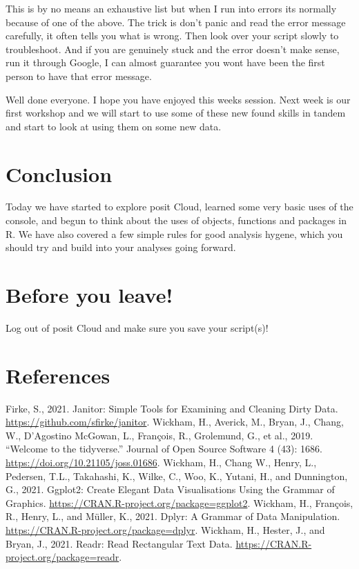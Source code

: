 \documentclass[
]{book}
\begin{document}
This is by no means an exhaustive list but when I run into errors its normally because of one of the above. The trick is don't panic and read the error message carefully, it often tells you what is wrong. Then look over your script slowly to troubleshoot. And if you are genuinely stuck and the error doesn't make sense, run it through Google, I can almost guarantee you wont have been the first person to have that error message.

Well done everyone. I hope you have enjoyed this weeks session. Next week is our first workshop and we will start to use some of these new found skills in tandem and start to look at using them on some new data.

\section{Conclusion}\label{conclusion}

Today we have started to explore posit Cloud, learned some very basic uses of the console, and begun to think about the uses of objects, functions and packages in R. We have also covered a few simple rules for good analysis hygene, which you should try and build into your analyses going forward.

\section{Before you leave!}\label{before-you-leave}

Log out of posit Cloud and make sure you save your script(s)!

\section{References}\label{references}

Firke, S., 2021. Janitor: Simple Tools for Examining and Cleaning Dirty Data. \url{https://github.com/sfirke/janitor}.
Wickham, H., Averick, M., Bryan, J., Chang, W., D'Agostino McGowan, L., François, R., Grolemund, G., et al., 2019. ``Welcome to the tidyverse.'' Journal of Open Source Software 4 (43): 1686. \url{https://doi.org/10.21105/joss.01686}.
Wickham, H., Chang W., Henry, L., Pedersen, T.L., Takahashi, K., Wilke, C., Woo, K., Yutani, H., and Dunnington, G., 2021. Ggplot2: Create Elegant Data Visualisations Using the Grammar of Graphics. \url{https://CRAN.R-project.org/package=ggplot2}.
Wickham, H., François, R., Henry, L., and Müller, K., 2021. Dplyr: A Grammar of Data Manipulation. \url{https://CRAN.R-project.org/package=dplyr}.
Wickham, H., Hester, J., and Bryan, J., 2021. Readr: Read Rectangular Text Data. \url{https://CRAN.R-project.org/package=readr}.
\end{document}
